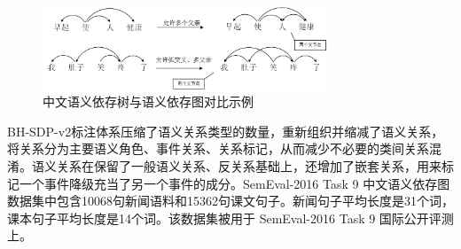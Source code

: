 \begin{figure}[tbhp]
	\centering
	\includegraphics[width=85mm]{picture/sem16diff.jpg}
	\caption{中文语义依存树与语义依存图对比示例}
	\label{fig:sem16diff}
\end{figure}

BH-SDP-v2标注体系压缩了语义关系类型的数量，重新组织并缩减了语义关系，将关系分为主要语义角色、事件关系、关系标记，从而减少不必要的类间关系混淆。语义关系在保留了一般语义关系、反关系基础上，还增加了嵌套关系，用来标记一个事件降级充当了另一个事件的成分。SemEval-2016 Task 9 中文语义依存图数据集中包含10068句新闻语料和15362句课文句子。新闻句子平均长度是31个词，课本句子平均长度是14个词。该数据集被用于 SemEval-2016 Task 9 国际公开评测上。

